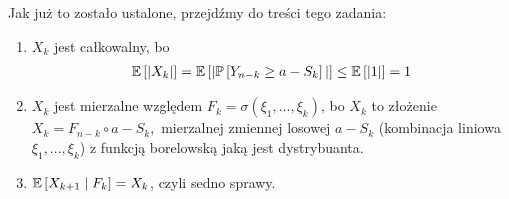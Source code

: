 \documentclass{article}
\begin{document}
Jak już to zostało ustalone, przejdźmy do treści tego zadania:
\begin{enumerate}
  \item $X_k$ jest całkowalny, bo
    \begin{align*}
      \expected{|X_k|}=\expected{|\prob{Y_{n-k}\geq a-S_k}|}\leq \expected{|1|}=1
    \end{align*}
  \item $X_k$ jest mierzalne względem $F_k=\sigma(\xi_1,...,\xi_k)$, bo $X_k$ to złożenie $X_k=F_{n-k}\circ a-S_k,$ mierzalnej zmiennej losowej $a-S_k$ (kombinacja liniowa $\xi_1,...,\xi_k$) z funkcją borelowską jaką jest dystrybuanta.


  \item $\expected{X_{k+1}}{F_k}=X_k$, czyli sedno sprawy.


\end{enumerate}
\end{document}
